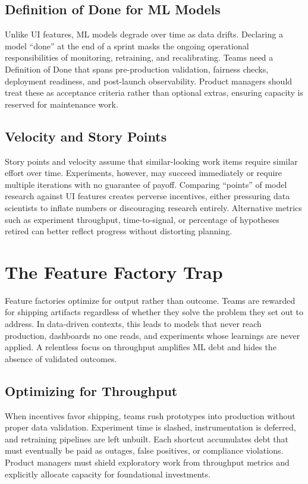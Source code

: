 \subsection{Definition of Done for ML Models}
Unlike UI features, ML models degrade over time as data drifts. Declaring a model ``done'' at the end of a sprint masks the ongoing operational responsibilities of monitoring, retraining, and recalibrating. Teams need a Definition of Done that spans pre-production validation, fairness checks, deployment readiness, and post-launch observability. Product managers should treat these as acceptance criteria rather than optional extras, ensuring capacity is reserved for maintenance work.

\subsection{Velocity and Story Points}
Story points and velocity assume that similar-looking work items require similar effort over time. Experiments, however, may succeed immediately or require multiple iterations with no guarantee of payoff. Comparing ``points'' of model research against UI features creates perverse incentives, either pressuring data scientists to inflate numbers or discouraging research entirely. Alternative metrics such as experiment throughput, time-to-signal, or percentage of hypotheses retired can better reflect progress without distorting planning.

\section{The Feature Factory Trap}
\label{sec:feature-factory}

Feature factories optimize for output rather than outcome. Teams are rewarded for shipping artifacts regardless of whether they solve the problem they set out to address. In data-driven contexts, this leads to models that never reach production, dashboards no one reads, and experiments whose learnings are never applied. A relentless focus on throughput amplifies ML debt and hides the absence of validated outcomes.

\subsection{Optimizing for Throughput}
When incentives favor shipping, teams rush prototypes into production without proper data validation. Experiment time is slashed, instrumentation is deferred, and retraining pipelines are left unbuilt. Each shortcut accumulates debt that must eventually be paid as outages, false positives, or compliance violations. Product managers must shield exploratory work from throughput metrics and explicitly allocate capacity for foundational investments.

